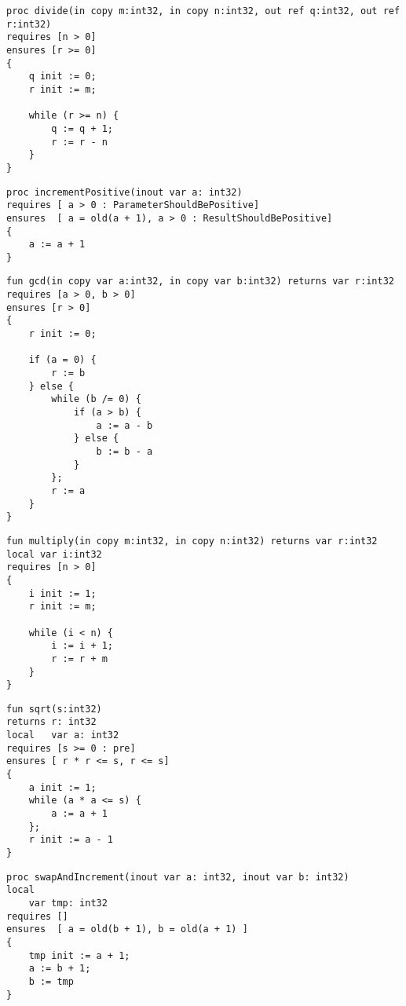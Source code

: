 
\begin{lstlisting}[caption=Pre-/postconditions in Prozeduren]
proc divide(in copy m:int32, in copy n:int32, out ref q:int32, out ref r:int32)
requires [n > 0]
ensures [r >= 0]
{
    q init := 0;
    r init := m;

    while (r >= n) {
        q := q + 1;
        r := r - n
    }
}
\end{lstlisting}

\begin{lstlisting}[caption=Pre-/postconditions in Prozeduren mit old Funktion]
proc incrementPositive(inout var a: int32)
requires [ a > 0 : ParameterShouldBePositive]
ensures  [ a = old(a + 1), a > 0 : ResultShouldBePositive]
{
	a := a + 1
}
\end{lstlisting}

\begin{lstlisting}[caption=Pre-/postconditions in Funktionen mit mehreren Conditions]
fun gcd(in copy var a:int32, in copy var b:int32) returns var r:int32
requires [a > 0, b > 0]
ensures [r > 0]
{
    r init := 0;
    
    if (a = 0) {
        r := b
    } else {
        while (b /= 0) {
            if (a > b) {
                a := a - b
            } else {
                b := b - a
            }
        };
        r := a
    }
}
\end{lstlisting}

\begin{lstlisting}[caption=Pre-/postconditions in Funktionen]
fun multiply(in copy m:int32, in copy n:int32) returns var r:int32
local var i:int32
requires [n > 0]
{
    i init := 1;
    r init := m;

    while (i < n) {
        i := i + 1;
        r := r + m
    }
}
\end{lstlisting}

\begin{lstlisting}[caption=Berechnen einer ganzzahligen Quadratwurzel. Verwendung mehrerer Conditions]
fun sqrt(s:int32)
returns r: int32
local   var a: int32
requires [s >= 0 : pre]
ensures [ r * r <= s, r <= s]
{
    a init := 1;
    while (a * a <= s) {
        a := a + 1
    };      
    r init := a - 1
}
\end{lstlisting}

\begin{lstlisting}[caption=Evaluieren einer Expression im preexecution State]
proc swapAndIncrement(inout var a: int32, inout var b: int32)
local 
    var tmp: int32
requires []
ensures  [ a = old(b + 1), b = old(a + 1) ]
{
    tmp init := a + 1;
    a := b + 1;
    b := tmp
}
\end{lstlisting}

